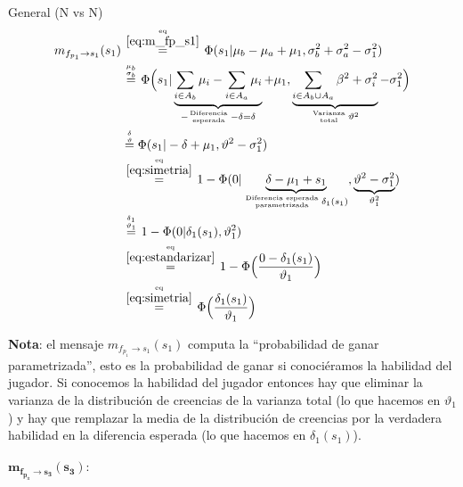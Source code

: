 \documentclass[article]{jss}
\newcommand\hfrac[2]{\genfrac{}{}{0pt}{}{#1}{#2}} %
\begin{document}
General (N vs N)
\begin{equation}\label{eq:m_fp_s1_gral}
\begin{split}
m_{f_{p_1} \rightarrow s_1}(s_1) & \overset{\hfrac{\text{eq}}{\ref{eq:m_fp_s1}}}{=} \Phi(s_1| \mu_b - \mu_a + \mu_1, \sigma_b^2 +\sigma_a^2 - \sigma_1^2 )  \\
& \overset{\hfrac{\mu_b}{\sigma_b}}{=} \Phi\Big(s_1| \underbrace{\sum_{i \in A_b} \mu_i - \sum_{i \in A_a} \mu_i }_{-\hfrac{\text{Diferencia}}{\text{esperada}} \, -\delta = \delta } + \mu_1 , \underbrace{\sum_{i \in A_b \cup A_a} \beta^2 + \sigma_i^2}_{\hfrac{\text{Varianza}}{\text{total}} \, \vartheta^2} - \sigma_1^2   \Big) \\
& \overset{\hfrac{\delta}{\vartheta}}{=} \Phi(s_1|-\delta + \mu_1,\vartheta^2-\sigma_1^2) \\
& \overset{\hfrac{\text{eq}}{\ref{eq:simetria}}}{=} 1- \Phi(0| \underbrace{\delta - \mu_1 + s_1}_{\hfrac{\text{Diferencia esperada}}{\text{parametrizada}} \, \delta_1(s_1)},\underbrace{\vartheta^2-\sigma_1^2}_{\vartheta_1^2}) \\
& \overset{\hfrac{\delta_1}{\vartheta_1}}{=} 1- \Phi(0|\delta_1(s_1),\vartheta_1^2) \\
&\overset{\hfrac{\text{eq}}{\ref{eq:estandarizar}}}{=} 1- \Phi\Big(\frac{0-\delta_1(s_1)}{\vartheta_1}\Big)\\
&\overset{\hfrac{\text{eq}}{\ref{eq:simetria}}}{=} \Phi\Big(\frac{\delta_1(s_1)}{\vartheta_1}\Big)
\end{split}
\end{equation}

\textbf{Nota}: el mensaje $m_{f_{p_1} \rightarrow s_1}(s_1)$ computa la ``probabilidad de ganar parametrizada'', esto es la probabilidad de ganar si conoci\'eramos la habilidad del jugador. Si conocemos la habilidad del jugador entonces hay que eliminar la varianza de la distribuci\'on de creencias de la varianza total (lo que hacemos en $\vartheta_1$) y hay que remplazar la media de la distribuci\'on de creencias por la verdadera habilidad en la diferencia esperada (lo que hacemos en $\delta_1(s_1)$).

\paragraph{$\bm{m_{f_{p_3} \rightarrow s_3}(s_3)}:$}
\end{document}
